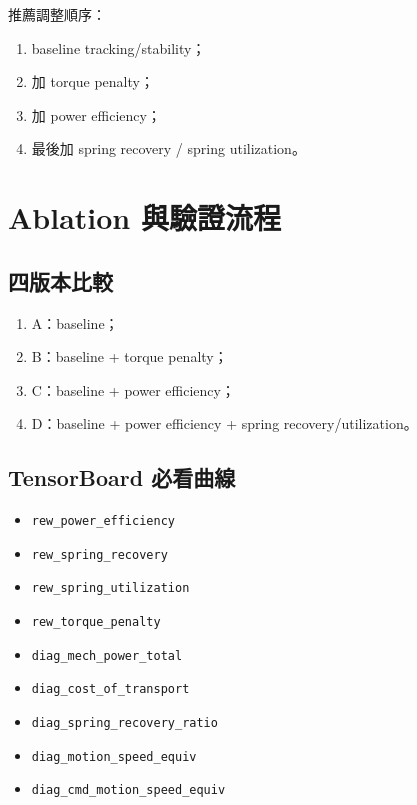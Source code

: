 \documentclass[12pt,a4paper,UTF8]{ctexart}
\begin{document}
推薦調整順序：
\begin{enumerate}[leftmargin=2em]
    \item baseline tracking/stability；
    \item 加 torque penalty；
    \item 加 power efficiency；
    \item 最後加 spring recovery / spring utilization。
\end{enumerate}

\section{Ablation 與驗證流程}

\subsection{四版本比較}

\begin{enumerate}[leftmargin=2em]
    \item A：baseline；
    \item B：baseline + torque penalty；
    \item C：baseline + power efficiency；
    \item D：baseline + power efficiency + spring recovery/utilization。
\end{enumerate}

\subsection{TensorBoard 必看曲線}

\begin{itemize}[leftmargin=2em]
    \item \texttt{rew\_power\_efficiency}
    \item \texttt{rew\_spring\_recovery}
    \item \texttt{rew\_spring\_utilization}
    \item \texttt{rew\_torque\_penalty}
    \item \texttt{diag\_mech\_power\_total}
    \item \texttt{diag\_cost\_of\_transport}
    \item \texttt{diag\_spring\_recovery\_ratio}
    \item \texttt{diag\_motion\_speed\_equiv}
    \item \texttt{diag\_cmd\_motion\_speed\_equiv}
\end{itemize}
\end{document}
